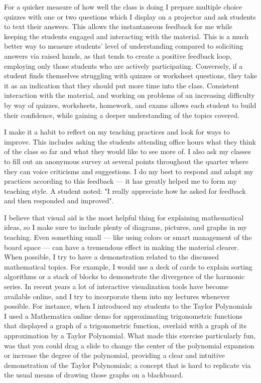 \documentclass[11pt]{article}
\begin{document}
For a quicker measure of how well the class is doing I prepare multiple choice quizzes with one or two questions which I display on a projector and ask students to text their answers. %
This allows the instantaneous feedback for me while keeping the students engaged and interacting with the material.
This is a much better way to measure students' level of understanding compared to soliciting answers via raised hands, as that tends to create a positive feedback loop, employing only those students who are actively participating.
Conversely, if a student finds themselves struggling with quizzes or worksheet questions, they take it as an indication that they should put more time into the class.
Consistent interaction with the material, and working on problems of an increasing difficulty by way of quizzes, worksheets, homework, and exams allows each student to build their confidence, while gaining a deeper understanding of the topics covered.

I make it a habit to reflect on my teaching practices and look for ways to improve.
This includes asking the students attending office hours what they think of the class so far and what they would like to see more of.
I also ask my classes to fill out an anonymous survey at several points throughout the quarter where they can voice criticisms and suggestions.
I do my best to respond and adapt my practices according to this feedback --- it has greatly helped me to form my teaching style.
A student noted: "I really appreciate how he asked for feedback and then responded and improved".

I believe that visual aid is the most helpful thing for explaining mathematical ideas, so 
I make sure to include plenty of diagrams, pictures, and graphs in my teaching.
Even something small --- like using colors or smart management of the board space --- can have a tremendous effect in making the material clearer.
When possible, I try to have a demonstration related to the discussed mathematical topics. %
For example, I would use a deck of cards to explain sorting algorithms
or a stack of blocks to demonstrate the divergence of the harmonic series.
In recent years a lot of interactive visualization tools have become available online, and I try to incorporate them into my lectures whenever possible.
For instance, when I introduced my students to the Taylor Polynomials I used a Mathematica online demo for approximating trigonometric functions that displayed a graph of a trigonometric function, overlaid with a graph of its approximation by a Taylor Polynomial.
What made this exercise particularly fun, was that you could drag a slide to change the center of the polynomial expansion or increase the degree of the polynomial, providing a clear and intuitive demonstration of the Taylor Polynomials; a concept that is hard to replicate via the usual means of drawing those graphs on a blackboard.
\end{document}
